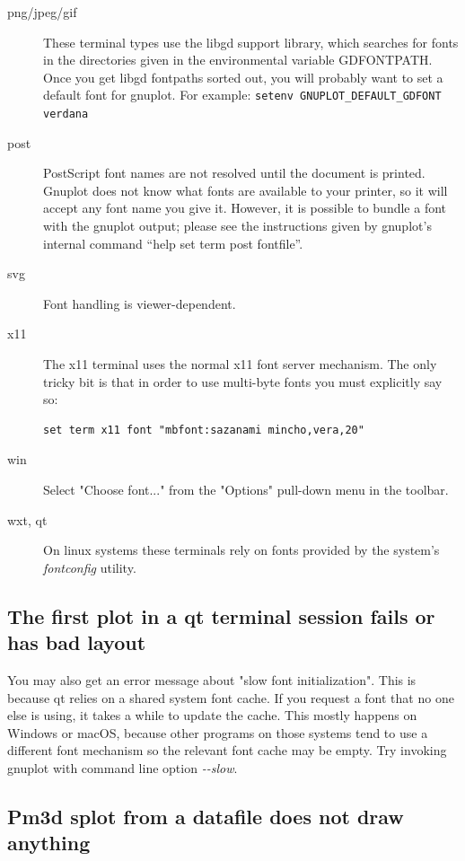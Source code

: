 \documentclass[letter,11pt]{article}
\begin{document}
{\begin{description}
\item [{png/jpeg/gif}] These terminal types use the libgd support library, which
searches for fonts in the directories given in the environmental variable
GDFONTPATH. Once you get libgd fontpaths sorted out, you will probably
want to set a default font for gnuplot.
For example: \verb+setenv GNUPLOT_DEFAULT_GDFONT verdana+
\item [{post}] PostScript font names are not resolved until the document
is printed. Gnuplot does not know what fonts are available to your
printer, so it will accept any font name you give it. However, it
is possible to bundle a font with the gnuplot output; please see the
instructions given by gnuplot's internal command {}``help set term
post fontfile''.
\item [{svg}] Font handling is viewer-dependent.
\item [{x11}] The x11 terminal uses the normal x11 font server mechanism.
The only tricky bit is that in order to use multi-byte fonts you must
explicitly say so:
\small\begin{verbatim}
set term x11 font "mbfont:sazanami mincho,vera,20"
\end{verbatim}\normalsize
\item [{win}] Select "Choose font..." from the "Options" pull-down menu
in the toolbar.
\item [{wxt, qt}] On linux systems these terminals rely on fonts provided
by the system's \textit{fontconfig} utility.
\end{description}

\subsection{The first plot in a qt terminal session fails or has bad layout}

You may also get an error message about "slow font initialization".
This is because qt relies on a shared system font cache.
If you request a font that no one else is using, it takes a while to
update the cache.  This mostly happens on Windows or macOS, because other
programs on those systems tend to use a different font mechanism so the 
relevant font cache may be empty.
Try invoking gnuplot with command line option {\em -\@-slow}.

\subsection{Pm3d splot from a datafile does not draw anything}

}
\end{document}
